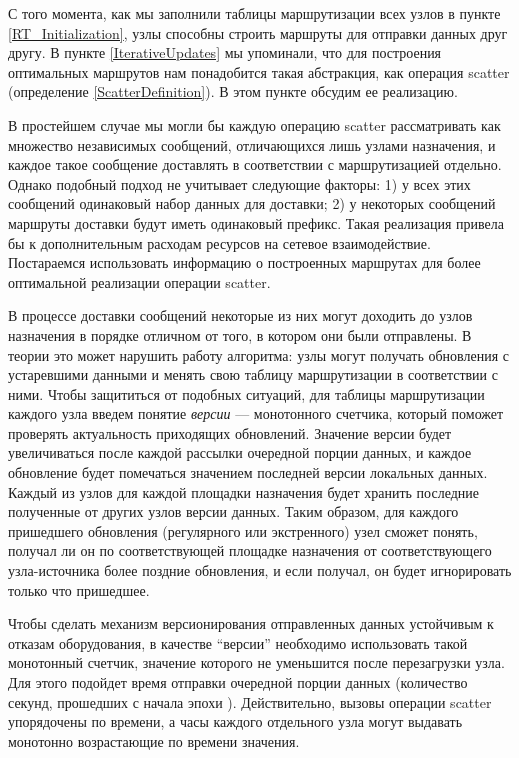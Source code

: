 С того момента, как мы заполнили таблицы маршрутизации всех узлов в пункте \ref{RT_Initialization}, узлы способны строить маршруты для отправки данных друг другу. В пункте \ref{IterativeUpdates} мы упоминали, что для построения оптимальных маршрутов нам понадобится такая абстракция, как операция scatter (определение \ref{ScatterDefinition}). В этом пункте обсудим ее реализацию.

В простейшем случае мы могли бы каждую операцию scatter рассматривать как множество независимых сообщений, отличающихся лишь узлами назначения, и каждое такое сообщение доставлять в соответствии с маршрутизацией отдельно. Однако подобный подход не учитывает следующие факторы: 1) у всех этих сообщений одинаковый набор данных для доставки; 2) у некоторых сообщений маршруты доставки будут иметь одинаковый префикс. Такая реализация привела бы к дополнительным расходам ресурсов на сетевое взаимодействие. Постараемся использовать информацию о построенных маршрутах для более оптимальной реализации операции scatter.

\begin{remark}
\label{message_versions}
    В процессе доставки сообщений некоторые из них могут доходить до узлов назначения в порядке отличном от того, в котором они были отправлены. В теории это может нарушить работу алгоритма: узлы могут получать обновления с устаревшими данными и менять свою таблицу маршрутизации в соответствии с ними. Чтобы защититься от подобных ситуаций, для таблицы маршрутизации каждого узла введем понятие \textit{версии} --- монотонного счетчика, который поможет проверять актуальность приходящих обновлений. Значение версии будет увеличиваться после каждой рассылки очередной порции данных, и каждое обновление будет помечаться значением последней версии локальных данных. Каждый из узлов для каждой площадки назначения будет хранить последние полученные от других узлов версии данных. Таким образом, для каждого пришедшего обновления (регулярного или экстренного) узел сможет понять, получал ли он по соответствующей площадке назначения от соответствующего узла-источника более поздние обновления, и если получал, он будет игнорировать только что пришедшее.
    
    Чтобы сделать механизм версионирования отправленных данных устойчивым к отказам оборудования, в качестве \enquote{версии} необходимо использовать такой монотонный счетчик, значение которого не уменьшится после перезагрузки узла. Для этого подойдет время отправки очередной порции данных (количество секунд, прошедших с начала эпохи \cite{UNIX_timestamp}). Действительно, вызовы операции scatter упорядочены по времени, а часы каждого отдельного узла могут выдавать монотонно возрастающие по времени значения.
\end{remark}

